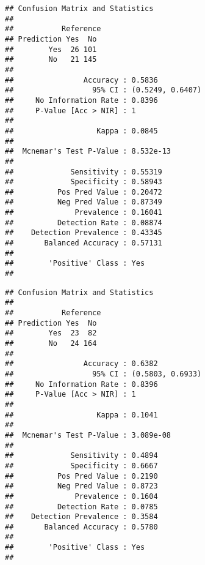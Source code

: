 \documentclass[
]{article}
\newenvironment{Shaded}{\begin{snugshade}}{\end{snugshade}}
\newcommand{\DataTypeTok}[1]{\textcolor[rgb]{0.13,0.29,0.53}{#1}}
\newcommand{\KeywordTok}[1]{\textcolor[rgb]{0.13,0.29,0.53}{\textbf{#1}}}
\newcommand{\NormalTok}[1]{#1}
\newcommand{\OperatorTok}[1]{\textcolor[rgb]{0.81,0.36,0.00}{\textbf{#1}}}
\newcommand{\StringTok}[1]{\textcolor[rgb]{0.31,0.60,0.02}{#1}}
\begin{document}
\begin{Shaded}
\end{Shaded}

\begin{verbatim}
## Confusion Matrix and Statistics
## 
##           Reference
## Prediction Yes  No
##        Yes  26 101
##        No   21 145
##                                           
##                Accuracy : 0.5836          
##                  95% CI : (0.5249, 0.6407)
##     No Information Rate : 0.8396          
##     P-Value [Acc > NIR] : 1               
##                                           
##                   Kappa : 0.0845          
##                                           
##  Mcnemar's Test P-Value : 8.532e-13       
##                                           
##             Sensitivity : 0.55319         
##             Specificity : 0.58943         
##          Pos Pred Value : 0.20472         
##          Neg Pred Value : 0.87349         
##              Prevalence : 0.16041         
##          Detection Rate : 0.08874         
##    Detection Prevalence : 0.43345         
##       Balanced Accuracy : 0.57131         
##                                           
##        'Positive' Class : Yes             
## 
\end{verbatim}

\begin{Shaded}
\end{Shaded}

\begin{verbatim}
## Confusion Matrix and Statistics
## 
##           Reference
## Prediction Yes  No
##        Yes  23  82
##        No   24 164
##                                           
##                Accuracy : 0.6382          
##                  95% CI : (0.5803, 0.6933)
##     No Information Rate : 0.8396          
##     P-Value [Acc > NIR] : 1               
##                                           
##                   Kappa : 0.1041          
##                                           
##  Mcnemar's Test P-Value : 3.089e-08       
##                                           
##             Sensitivity : 0.4894          
##             Specificity : 0.6667          
##          Pos Pred Value : 0.2190          
##          Neg Pred Value : 0.8723          
##              Prevalence : 0.1604          
##          Detection Rate : 0.0785          
##    Detection Prevalence : 0.3584          
##       Balanced Accuracy : 0.5780          
##                                           
##        'Positive' Class : Yes             
## 
\end{verbatim}
\end{document}
